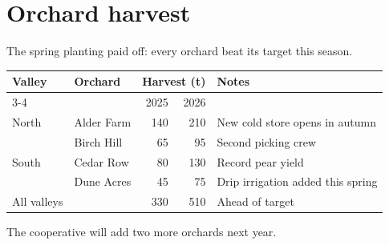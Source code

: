 \documentclass{article}
\begin{document}
\section*{Orchard harvest}
The spring planting paid off: every orchard beat its target this season.

\begin{center}
\begin{tabular}{llrrp{3.2cm}}
\toprule
Valley & Orchard & \multicolumn{2}{c}{Harvest (t)} & Notes \\
\cmidrule(lr){3-4}
 & & 2025 & 2026 & \\
\midrule
North & Alder Farm & 140 & 210 & New cold store opens in autumn \\
 & Birch Hill & 65 & 95 & Second picking crew \\
South & Cedar Row & 80 & 130 & Record pear yield \\
 & Dune Acres & 45 & 75 & Drip irrigation added this spring \\
All valleys & & 330 & 510 & Ahead of target \\
\bottomrule
\end{tabular}
\end{center}

The cooperative will add two more orchards next year.
\end{document}
